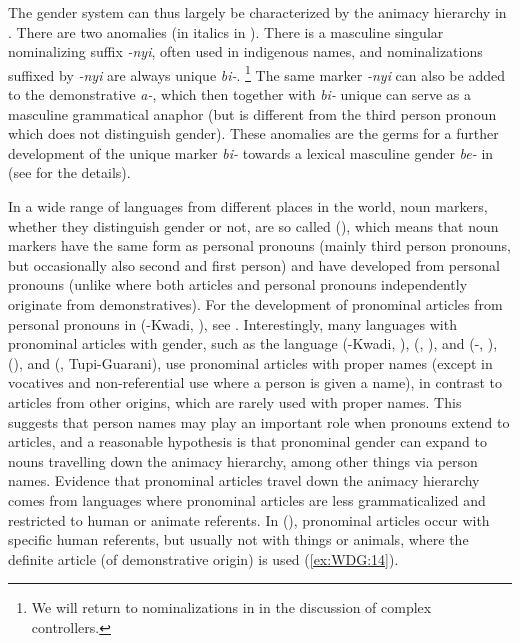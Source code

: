 \documentclass[output=collectionpaper]{langsci/langscibook}
\begin{document}
The  gender system can thus largely be characterized by the animacy hierarchy in . There are two anomalies (in italics in ). There is a masculine singular nominalizing suffix \textit{-nyi}, often used in indigenous names, and nominalizations suffixed by \textit{-nyi} are always unique \textit{bi-}.%
\footnote{%
We will return to  nominalizations in  in the discussion of complex controllers.
} %
The same marker \textit{-nyi} can also be added to the demonstrative \textit{a-}, which then together with \textit{bi-} unique can serve as a masculine grammatical anaphor (but is different from the third person pronoun which does not distinguish gender). These anomalies are the germs for a further development of the  unique marker \textit{bi-} towards a lexical masculine gender \textit{be-} in  (see \citealt{Waelchli2018} for the details).

In a wide range of languages from different places in the world, noun markers, whether they distinguish gender or not, are so called  (\citealt[838]{Himmelmann2001}), which means that noun markers have the same form as personal pronouns (mainly third person pronouns, but occasionally also second and first person) and have developed from personal pronouns (unlike  where both articles and personal pronouns independently originate from demonstratives). For the development of pronominal articles from personal pronouns in  (-Kwadi, ), see \cite[231--234]{Heine1984}. Interestingly, many languages with pronominal articles with gender, such as the  language  (-Kwadi, ),  (, ),  and  (-, ),  (),  and  (, Tupi-Guarani), use pronominal articles with proper names (except in vocatives and non-referential use where a person is given a name), in contrast to articles from other origins, which are rarely used with proper names. This suggests that person names may play an important role when pronouns extend to articles, and a reasonable hypothesis is that pronominal gender can expand to nouns travelling down the animacy hierarchy, among other things via person names. Evidence that pronominal articles travel down the animacy hierarchy comes from languages where pronominal articles are less grammaticalized and restricted to human or animate referents. In  (\citealt[178--184]{Loughnane2009}), pronominal articles occur with specific human referents, but usually not with things or animals, where the definite article (of demonstrative origin) is used (\ref{ex:WDG:14}).
\end{document}
